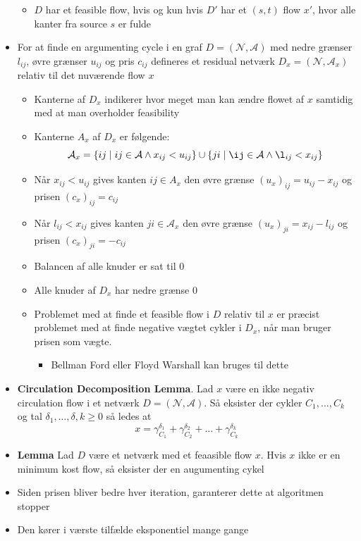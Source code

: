 \begin{itemize}
\begin{itemize}
    \item $D$ har et feasible flow, hvis og kun hvis $D'$ har et $(s,t)$ flow $x'$, hvor alle kanter fra source $s$ er fulde 
  \end{itemize}
  \item For at finde en argumenting cycle i en graf $D=(\mathcal N, \mathcal A)$ med nedre grænser $l_{ij}$, øvre grænser $u_{ij}$ og pris $c_{ij}$ defineres et residual netværk $D_x= (\mathcal N, \mathcal A_x)$ relativ til det nuværende flow $x$
  \begin{itemize}
  	\item Kanterne af $D_x$ indikerer hvor meget man kan ændre flowet af $x$ samtidig med at man overholder feasibility
    \item Kanterne $A_x$ af $D_x$ er følgende:
    \begin{equation*}
      \mathcal A_x = \{ij \mid ij \in \mathcal A \land x_{ij} < u_{ij} \} \cup \{ji \mid \ij \in \mathcal A \land \l_{ij} < x_{ij} \}
    \end{equation*}
    \item Når $x_{ij} < u_{ij}$ gives kanten $ij \in A_x$ den øvre grænse $(u_x)_{ij} = u_{ij} - x_{ij}$ og prisen $(c_x)_{ij} = c_{ij}$
	  \item Når $l_{ij} < x_{ij}$ gives kanten $ji \in \mathcal A_x$ den øvre grænse $(u_x)_{ji} = x_{ij} - l_{ij}$ og prisen $(c_x)_{ji} = -c_{ij}$
    \item Balancen af alle knuder er sat til $0$ 
    \item Alle knuder af $D_x$ har nedre grænse $0$ 
    \item Problemet med at finde et feasible flow i $D$ relativ til $x$ er præcist problemet med at finde negative vægtet cykler i $D_x$, når man bruger prisen som vægte. 
    \begin{itemize}
    	\item Bellman Ford eller Floyd Warshall kan bruges til dette
    \end{itemize}
  \end{itemize}
  \item \textbf{Circulation Decomposition Lemma}. Lad $x$ være en ikke negativ circulation flow i et netværk $D=(\mathcal N, \mathcal A)$. Så eksister der cykler $C_1, \dots, C_k$ og  tal $\delta_1, \dots, \delta,k \geq 0$ så ledes at
  \begin{equation*}
    x = \gamma_{C_1}^{\delta_1} + \gamma_{C_2}^{\delta_2} + \dots + \gamma_{C_k}^{\delta_k}
  \end{equation*}

  \item \textbf{Lemma} Lad $D$ være et netværk med et feaasible flow $x$. Hvis $x$ ikke er en minimum kost flow, så eksister der en augumenting cykel
  \item Siden prisen bliver bedre hver iteration, garanterer dette at algoritmen stopper  
  \item Den kører i værste tilfælde eksponentiel mange gange
\end{itemize}
